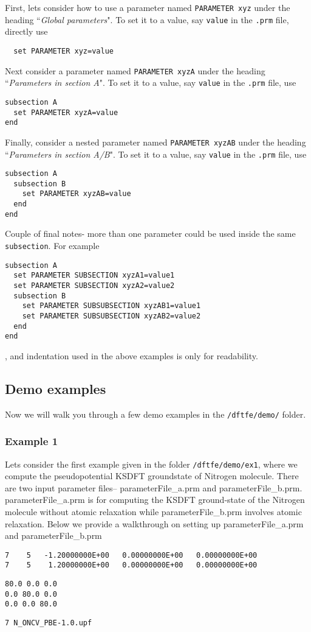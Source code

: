 First, lets consider how to use a parameter named \verb|PARAMETER xyz| under the heading ``{\it Global parameters}". To set it to a value, say \verb|value|  in the  \verb|.prm| file, directly use
\begin{verbatim}
  set PARAMETER xyz=value
\end{verbatim}
Next consider a parameter named \verb|PARAMETER xyzA| under the heading ``{\it Parameters in section A}". To set it to a value, say \verb|value|  in the  \verb|.prm| file, use 
\begin{verbatim}
subsection A
  set PARAMETER xyzA=value
end
\end{verbatim}
Finally, consider a nested parameter named  \verb|PARAMETER xyzAB| under the heading ``{\it Parameters in section A/B}". To set it to a value, say \verb|value|  in the  \verb|.prm| file, use 
\begin{verbatim}
subsection A
  subsection B
    set PARAMETER xyzAB=value
  end
end
\end{verbatim}
Couple of final notes- more than one parameter could be used inside the same \verb|subsection|. For example
\begin{verbatim}
subsection A
  set PARAMETER SUBSECTION xyzA1=value1
  set PARAMETER SUBSECTION xyzA2=value2
  subsection B
    set PARAMETER SUBSUBSECTION xyzAB1=value1
    set PARAMETER SUBSUBSECTION xyzAB2=value2
  end
end
\end{verbatim}
, and indentation used in the above examples is only for readability.
\subsection{Demo examples}
Now we will walk you through a few demo examples in the \verb|/dftfe/demo/| folder. 
\subsubsection{Example 1}
Lets consider the first example given in the folder
\verb|/dftfe/demo/ex1|, where we compute the pseudopotential KSDFT groundstate of Nitrogen molecule.
There are two input parameter files-- parameterFile\_a.prm and parameterFile\_b.prm. parameterFile\_a.prm is
for computing the KSDFT ground-state of the Nitrogen molecule without atomic relaxation while parameterFile\_b.prm involves atomic relaxation.
Below we provide a walkthrough on setting up parameterFile\_a.prm and parameterFile\_b.prm
\begin{verbatim}
7    5   -1.20000000E+00   0.00000000E+00   0.00000000E+00
7    5    1.20000000E+00   0.00000000E+00   0.00000000E+00
\end{verbatim}

\begin{verbatim}
80.0 0.0 0.0
0.0 80.0 0.0
0.0 0.0 80.0
\end{verbatim}

\begin{verbatim}
7 N_ONCV_PBE-1.0.upf
\end{verbatim}
